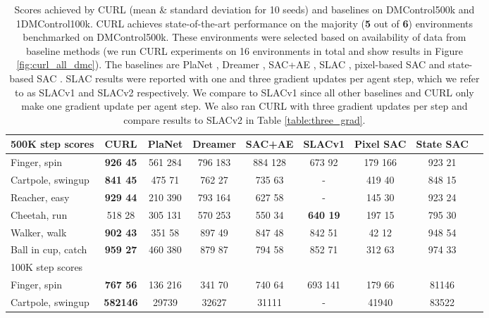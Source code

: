 \documentclass{article}
\begin{document}
\begin{table*}[ht]
\caption{Scores achieved by CURL (mean \& standard deviation for 10 seeds) and baselines on DMControl500k and 1DMControl100k. CURL achieves state-of-the-art performance on the majority (\textbf{5} out of \textbf{6}) environments benchmarked on DMControl500k. These environments were selected based on availability of data from baseline methods (we run CURL experiments on 16 environments in total and show results in Figure \ref{fig:curl_all_dmc}). The baselines are PlaNet \cite{hafner2018learning}, Dreamer \cite{hafner2019dream}, SAC+AE \cite{yarats2019improving}, SLAC \cite{lee2019stochastic}, pixel-based SAC and state-based SAC \cite{haarnoja2018soft}. SLAC results were reported with one and three gradient updates per agent step, which we refer to as SLACv1 and SLACv2 respectively. We compare to SLACv1 since all other baselines and CURL only make one gradient update per agent step. We also ran CURL with three gradient updates per step and compare results to SLACv2 in Table \ref{table:three_grad}.}
\label{table:500kscores}
\vskip 0.15in
\begin{center}
\begin{small}
\begin{sc}
\begin{tabular}{lcccccccc}
\toprule
500K step scores & CURL & PlaNet & Dreamer & SAC+AE & SLACv1 & Pixel SAC &  State SAC \\
\midrule
Finger, spin    & \textbf{ 926  45} & 561  284 & 796  183  & 884  128 &   673  92 & 179  166  & 923  21 \\
Cartpole, swingup & \textbf{841  45}& 475  71& 762  27 & 735  63 & - & 419  40 &  848  15 \\
Reacher, easy    & \textbf{929  44}& 210  390& 793  164 & 627  58 & - & 145  30 &  923  24 \\
Cheetah, run   & 518  28 & 305  131& 570  253 & 550  34 &  \textbf{640  19} & 197  15 & 795  30 \\
Walker, walk      & \textbf{902  43}& 351  58 & 897  49 & 847  48  & 842  51 & 42  12 & 948  54 \\
Ball in cup, catch  & \textbf{959  27} & 460   380 & 879   87 & 794  58  &  852   71 & 312  63 & 974  33\\
\midrule
100K step scores  &  &  &  &  &  &  &  \\
\midrule
Finger, spin    &  \textbf{767  56 } & 136  216 & 341  70& 740  64 &  693  141 & 179  66 &  81146 \\
Cartpole, swingup & \textbf{582146}& 29739& 32627 & 31111 & - & 41940 & 83522\\

\end{tabular}
\end{sc}
\end{small}
\end{center}
\end{table*}
\end{document}
